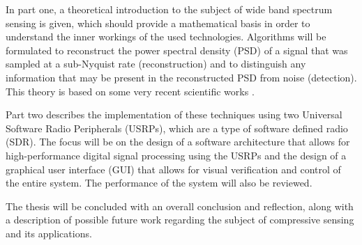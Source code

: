 \documentclass[a4paper, openany, oneside]{memoir}
\begin{document}
In part one, a theoretical introduction to the subject of wide band spectrum sensing is given, which should provide a mathematical basis in order to understand the inner workings of the used technologies. Algorithms will be formulated to reconstruct the power spectral density (PSD) of a signal that was sampled at a sub-Nyquist rate (reconstruction) and to distinguish any information that may be present in the reconstructed PSD from noise (detection). This theory is based on some very recent scientific works \cite{ariananda2011multicoset, ariananda2012compressive}.

Part two describes the implementation of these techniques using two Universal Software Radio Peripherals (USRPs), which are a type of software defined radio (SDR). The focus will be on the design of a software architecture that allows for high-performance digital signal processing using the USRPs and the design of a graphical user interface (GUI) that allows for visual verification and control of the entire system. The performance of the system will also be reviewed.

The thesis will be concluded with an overall conclusion and reflection, along with a description of possible future work regarding the subject of compressive sensing and its applications.
\end{document}
